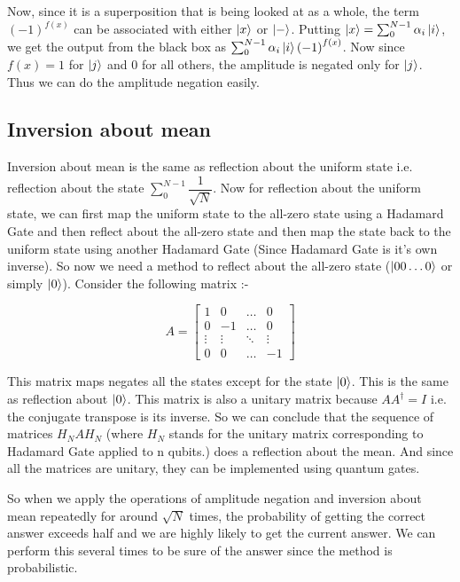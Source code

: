 \documentclass[13pt]{article}
\begin{document}
Now, since it is a superposition that is being looked at as a whole, the term $\left( -1 \right) ^ {f(x)}$ can be associated with either $\ket{x}$ or $\ket{-}$.
Putting $\ket{x}  = \sum_0^{N-1}\alpha_i\ket{i}$, we get the output from the black box as $\sum_0^{N-1}\alpha_i\ket{i} \left( -1 \right) ^ {f(x)}$. Now since $f(x) = 1$ for $\ket{j}$ and $0$ for all others, the amplitude is negated only for $\ket{j}$. Thus we can do the amplitude negation easily.
\subsection{Inversion about mean}
Inversion about mean is the same as reflection about the uniform state i.e. reflection about the state $\sum_0 ^{N - 1} \dfrac{1}{\sqrt{N}}$. Now for reflection about the uniform state, we can first map the uniform state to the all-zero state using a Hadamard Gate and then reflect about the all-zero state and then map the state back to the uniform state using another Hadamard Gate (Since Hadamard Gate is it's own inverse). So now we need a method to reflect about the all-zero state ($\ket{00\dots0}$ or simply $\ket{0}$). Consider the following matrix :-

\[
A = \begin{bmatrix}
    1       & 0      & \dots & 0 \\
    0       & -1     & \dots & 0 \\
    \vdots  & \vdots & \ddots & \vdots \\
    0       & 0      & \dots  & -1
    \end{bmatrix}
\]

This matrix maps negates all the states except for the state $\ket{0}$. This is the same as reflection about $\ket{0}$. This matrix is also a unitary matrix because $A A^{\dagger} = I$ i.e. the conjugate transpose is its inverse. So we can conclude that the sequence of matrices $H_N A H_N$ (where $H_N$ stands for the unitary matrix corresponding to Hadamard Gate applied to n qubits.) does a reflection about the mean. And since all the matrices are unitary, they can be implemented using quantum gates.

So when we apply the operations of amplitude negation and inversion about mean repeatedly for around $\sqrt{N}$ times, the probability of getting the correct answer exceeds half and we are highly likely to get the current answer. We can perform this several times to be sure of the answer since the method is probabilistic.
\end{document}
